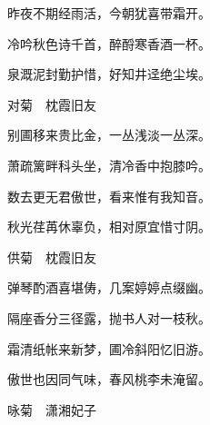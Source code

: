\begin{poem}
\begin{pl}
        昨夜不期经雨活，今朝犹喜带霜开。
    \end{pl}
    \begin{pl}

        冷吟秋色诗千首，醉酹寒香酒一杯。
    \end{pl}
    \begin{pl}

        泉溉泥封勤护惜，好知井迳绝尘埃。
    \end{pl}
    \emptypl

    \begin{pl}

        对菊　枕霞旧友
    \end{pl}
    \begin{pl}

        别圃移来贵比金，一丛浅淡一丛深。
    \end{pl}
    \begin{pl}

        萧疏篱畔科头坐，清冷香中抱膝吟。
    \end{pl}
    \begin{pl}

        数去更无君傲世，看来惟有我知音。
    \end{pl}
    \begin{pl}

        秋光荏苒休辜负，相对原宜惜寸阴。
    \end{pl}
    \emptypl

    \begin{pl}

        供菊　枕霞旧友
    \end{pl}
    \begin{pl}

        弹琴酌酒喜堪俦，几案婷婷点缀幽。
    \end{pl}
    \begin{pl}

        隔座香分三径露，抛书人对一枝秋。
    \end{pl}
    \begin{pl}

        霜清纸帐来新梦，圃冷斜阳忆旧游。
    \end{pl}
    \begin{pl}

        傲世也因同气味，春风桃李未淹留。
    \end{pl}
    \emptypl
    \begin{pl}

        咏菊　潇湘妃子
    \end{pl}
    \begin{pl}


\end{pl}
\end{poem}
